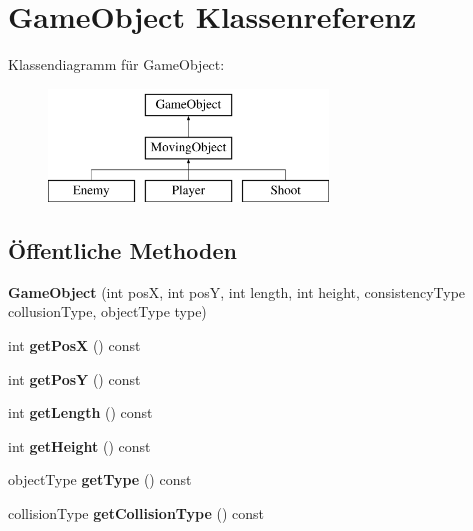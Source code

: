 \hypertarget{classGameObject}{\section{Game\-Object Klassenreferenz}
\label{classGameObject}
}
Klassendiagramm für Game\-Object\-:\begin{figure}[H]
\begin{center}
\leavevmode
\includegraphics[height=3.000000cm]{classGameObject}
\end{center}
\end{figure}
\subsection*{Öffentliche Methoden}
\begin{DoxyCompactItemize}
\item 
\hypertarget{classGameObject_ab927cea08154292d6f4ab73c3fb9351b}{{\bfseries Game\-Object} (int pos\-X, int pos\-Y, int length, int height, consistency\-Type collusion\-Type, object\-Type type)}\label{classGameObject_ab927cea08154292d6f4ab73c3fb9351b}

\item 
\hypertarget{classGameObject_a92433f7589ed0c8053e06bd468d81be6}{int {\bfseries get\-Pos\-X} () const }\label{classGameObject_a92433f7589ed0c8053e06bd468d81be6}

\item 
\hypertarget{classGameObject_a30cd47267461d569b2b601edb2c849c8}{int {\bfseries get\-Pos\-Y} () const }\label{classGameObject_a30cd47267461d569b2b601edb2c849c8}

\item 
\hypertarget{classGameObject_a172ffc6cb61b0da947f3eabbba57ef51}{int {\bfseries get\-Length} () const }\label{classGameObject_a172ffc6cb61b0da947f3eabbba57ef51}

\item 
\hypertarget{classGameObject_a2553f445dc1aa30defaa3bc0875927ba}{int {\bfseries get\-Height} () const }\label{classGameObject_a2553f445dc1aa30defaa3bc0875927ba}

\item 
\hypertarget{classGameObject_ad13359758249110f2a895902b5bd290f}{object\-Type {\bfseries get\-Type} () const }\label{classGameObject_ad13359758249110f2a895902b5bd290f}

\item 
\hypertarget{classGameObject_abb24a9a876a528285b394753c8a38c42}{collision\-Type {\bfseries get\-Collision\-Type} () const }\label{classGameObject_abb24a9a876a528285b394753c8a38c42}

\end{DoxyCompactItemize}

